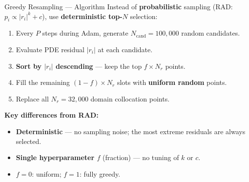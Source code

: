 \documentclass[aspectratio=169, 11pt]{beamer}
\begin{document}
\begin{frame}{Greedy Resampling --- Algorithm}
  Instead of \textbf{probabilistic} sampling (RAD: $p_i \propto |r_i|^k + c$),
  use \textbf{deterministic top-$N$} selection:

  \medskip
  \begin{enumerate}
    \item Every $P$ steps during Adam, generate $N_{\text{cand}} = 100{,}000$
          random candidates.
    \item Evaluate PDE residual $|r_i|$ at each candidate.
    \item \textbf{Sort by $|r_i|$ descending} --- keep the top $f \times N_r$ points.
    \item Fill the remaining $(1\!-\!f) \times N_r$ slots with \textbf{uniform random} points.
    \item Replace all $N_r = 32{,}000$ domain collocation points.
  \end{enumerate}

  \medskip
  \textbf{Key differences from RAD:}
  \begin{itemize}
    \item \textbf{Deterministic} --- no sampling noise; the most extreme residuals
          are always selected.
    \item \textbf{Single hyperparameter $f$} (fraction) ---
          no tuning of $k$ or $c$.
    \item $f = 0$: uniform; \; $f = 1$: fully greedy.
  \end{itemize}
\end{frame}
\end{document}
